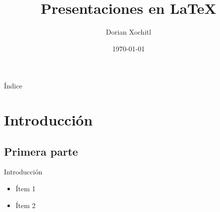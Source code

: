 \documentclass{beamer}
\title{Presentaciones en \LaTeX}
\author{Dorian Xochitl}
\institute{BEDU}
\date{\today}
\begin{document}
 \begin{frame}
  \maketitle
 \end{frame}
 
 \begin{frame}{Índice}
  \tableofcontents
 \end{frame}
 
 \section{Introducción}
 \subsection{Primera parte}

 \begin{frame}{Introducción}
  \begin{itemize}
   \item<1-> Ítem 1
   \item<2> Ítem 2
  \end{itemize}
 \end{frame}
\end{document}
